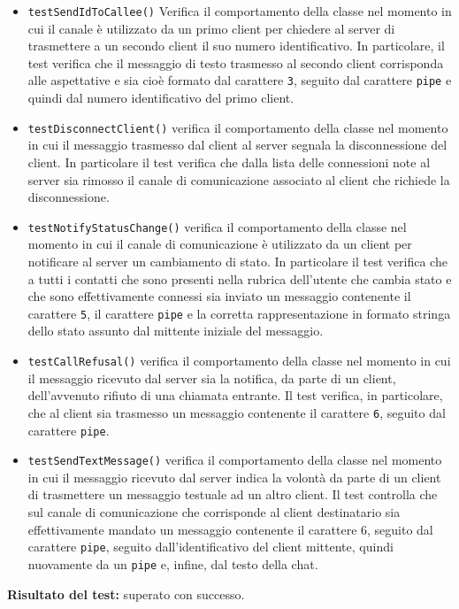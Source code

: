 \begin{itemize}
\begin{itemize}
\item \texttt{testSendIdToCallee()} Verifica il comportamento della classe nel momento in cui il canale è utilizzato da un primo client per chiedere al server di trasmettere a un secondo client il suo numero identificativo. In particolare, il test verifica che il messaggio di testo trasmesso al secondo client corrisponda alle aspettative e sia cioè formato dal carattere \texttt{3}, seguito dal carattere \texttt{pipe} e quindi dal numero identificativo del primo client.

\item \texttt{testDisconnectClient()} verifica il comportamento della classe nel momento in cui il messaggio trasmesso dal client al server segnala la disconnessione del client. In particolare il test verifica che dalla lista delle connessioni note al server sia rimosso il canale di comunicazione associato al client che richiede la disconnessione.

\item \texttt{testNotifyStatusChange()} verifica il comportamento della classe nel momento in cui il canale di comunicazione è utilizzato da un client per notificare al server un cambiamento di stato. In particolare il test verifica che a tutti i contatti che sono presenti nella rubrica dell'utente che cambia stato e che sono effettivamente connessi sia inviato un messaggio contenente il carattere \texttt{5}, il carattere \texttt{pipe} e la corretta rappresentazione in formato stringa dello stato assunto dal mittente iniziale del messaggio.

\item \texttt{testCallRefusal()} verifica il comportamento della classe nel momento in cui il messaggio  ricevuto dal server sia la notifica, da parte di un client, dell'avvenuto rifiuto di una chiamata entrante. Il test verifica, in particolare, che al client sia trasmesso un messaggio contenente il carattere \texttt{6}, seguito dal carattere \texttt{pipe}.

\item \texttt{testSendTextMessage()} verifica il comportamento della classe nel momento in cui il messaggio ricevuto dal server indica la volontà da parte di un client di trasmettere un messaggio testuale ad un altro client. Il test controlla che sul canale di comunicazione che corrisponde al client destinatario sia effettivamente mandato un messaggio contenente il carattere 6, seguito dal carattere \texttt{pipe}, seguito dall'identificativo del client mittente, quindi nuovamente da un \texttt{pipe} e, infine, dal testo della chat.

\end{itemize}
\textbf{Risultato del test:} superato con successo.
\end{itemize}


